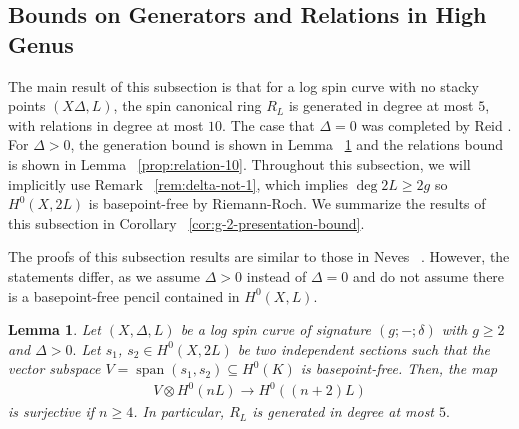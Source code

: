 \documentclass{amsart}
\theoremstyle{plain}
\newtheorem{lem}[thm]{Lemma}
\theoremstyle{definition}
\theoremstyle{remark}
\numberwithin{equation}{section}
\newcommand\ssec{\subsection}
\newcommand{\halfcan}{L}
\DeclareMathOperator{\newspan}{span}
\begin{document}
\ssec{Bounds on Generators and Relations in High Genus}
\label{ssec:bounds-high-genus}

The main result of this subsection is that for a log spin curve with no stacky points $(X \Delta, L)$, the spin canonical ring $R_\halfcan$ is generated in degree at most $5$, with relations in degree at most $10$. The case that $\Delta = 0$ was completed by Reid \cite[Theorem 3.4]{reid:infinitesimal}. For $\Delta > 0$, the generation bound is shown in Lemma ~\ref{lem:generation-5} and the relations bound is shown in Lemma ~\ref{prop:relation-10}. Throughout this subsection, we will implicitly use Remark ~\ref{rem:delta-not-1}, which implies $\deg 2L \geq 2g$ so $H^0(X, 2L)$ is basepoint-free by Riemann-Roch. We summarize the results of this subsection in Corollary ~\ref{cor:g-2-presentation-bound}.

The proofs of this subsection results are similar to those in Neves ~\cite[Proposition III.4 and Proposition III.12]{neves:halfcan}. However, the statements differ, as we assume $\Delta > 0$ instead of $\Delta = 0$ and do not assume there is a basepoint-free pencil contained in $H^0(X, L).$ 

%

\begin{lem}
\label{lem:generation-5}
Let $(X, \Delta, L)$ be a log spin curve of signature $(g; -;\delta)$
with $g \geq 2$ and $\Delta > 0.$ Let $s_1$, $s_2 \in H^0(X, 2L)$
be two independent sections such that the vector subspace $V =
\newspan(s_1, s_2) \subseteq H^0(K)$ is basepoint-free. Then, the map
\begin{align*}
	V \otimes H^0(nL) \rightarrow H^0((n+2)L)
\end{align*}
is surjective if $n \geq 4$. In particular, $R_\halfcan$ is generated in degree at most $5.$
\end{lem}
\end{document}
